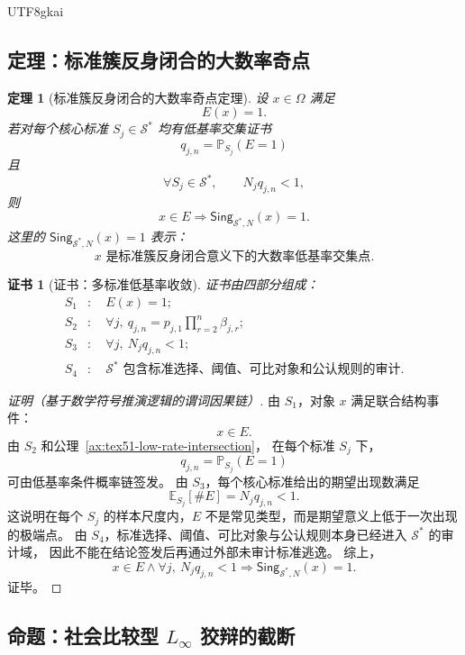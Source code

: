 \documentclass[12pt]{article}
\newtheorem{theorem}{定理}[section]
\newtheorem{Certificate}{证书}[section]
\newcommand{\Linfty}{\ensuremath{L_\infty}}
\begin{document}
\begin{CJK*}{UTF8}{gkai}
\subsection{定理：标准簇反身闭合的大数率奇点}
\label{subsec:tex51-large-number-singularity}

\begin{theorem}[标准簇反身闭合的大数率奇点定理]
\label{thm:tex51-large-number-singularity}
设 \(x\in\Omega\) 满足
\[
  E(x)=1.
\]
若对每个核心标准 \(S_j\in\mathcal S^\ast\) 均有低基率交集证书
\[
  q_{j,n}=\mathbb P_{S_j}(E=1)
\]
且
\[
  \forall S_j\in\mathcal S^\ast,\qquad
  N_jq_{j,n}<1,
\]
则
\[
  x\in E
  \Longrightarrow
  \mathsf{Sing}_{\mathcal S^\ast,N}(x)=1.
\]
这里的 \(\mathsf{Sing}_{\mathcal S^\ast,N}(x)=1\) 表示：
\[
  x
  \text{ 是标准簇反身闭合意义下的大数率低基率交集点}.
\]
\end{theorem}

\begin{Certificate}[证书：多标准低基率收敛]
\label{cert:tex51-large-number-singularity}
证书由四部分组成：
\[
\begin{aligned}
  S_1&:\quad E(x)=1;\\
  S_2&:\quad \forall j,\ q_{j,n}
  =p_{j,1}\prod_{r=2}^{n}\beta_{j,r};\\
  S_3&:\quad \forall j,\ N_jq_{j,n}<1;\\
  S_4&:\quad \mathcal S^\ast
  \text{ 包含标准选择、阈值、可比对象和公认规则的审计}.
\end{aligned}
\]
\end{Certificate}

\begin{proof}[证明（基于数学符号推演逻辑的谓词因果链）]
由 \(S_1\)，对象 \(x\) 满足联合结构事件：
\[
  x\in E.
\]
由 \(S_2\) 和公理~\ref{ax:tex51-low-rate-intersection}，
在每个标准 \(S_j\) 下，
\[
  q_{j,n}=\mathbb P_{S_j}(E=1)
\]
可由低基率条件概率链签发。
由 \(S_3\)，每个核心标准给出的期望出现数满足
\[
  \mathbb E_{S_j}[\#E]
  =
  N_jq_{j,n}
  <
  1.
\]
这说明在每个 \(S_j\) 的样本尺度内，\(E\) 不是常见类型，而是期望意义上低于一次出现的极端点。
由 \(S_4\)，标准选择、阈值、可比对象与公认规则本身已经进入 \(\mathcal S^\ast\) 的审计域，
因此不能在结论签发后再通过外部未审计标准逃逸。
综上，
\[
  x\in E
  \wedge
  \forall j,\ N_jq_{j,n}<1
  \Longrightarrow
  \mathsf{Sing}_{\mathcal S^\ast,N}(x)=1.
\]
证毕。
\end{proof}

\subsection{命题：社会比较型 \(\Linfty\) 狡辩的截断}
\label{subsec:tex51-social-linfty-cut}


\end{CJK*}
\end{document}
